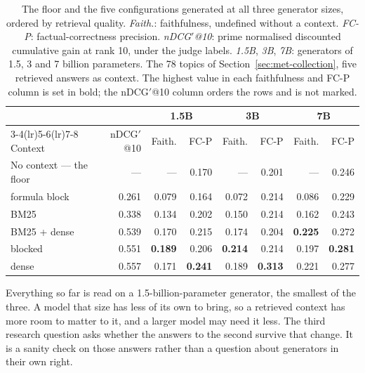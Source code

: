 \begin{table}[!t]
\centering
\small
\setlength{\tabcolsep}{4.5pt}
\renewcommand{\arraystretch}{1.15}
\begin{tabular}{lrrrrrrr}
\toprule
& & \multicolumn{2}{c}{1.5B} & \multicolumn{2}{c}{3B} & \multicolumn{2}{c}{7B} \\
\cmidrule(lr){3-4}\cmidrule(lr){5-6}\cmidrule(lr){7-8}
Context & nDCG$'$@10 & Faith. & FC-P & Faith. & FC-P & Faith. & FC-P \\
\midrule
No context --- the floor & ---   & ---   & 0.170 & ---   & 0.201 & ---   & 0.246 \\
\addlinespace
formula block            & 0.261 & 0.079 & 0.164 & 0.072 & 0.214 & 0.086 & 0.229 \\
BM25                     & 0.338 & 0.134 & 0.202 & 0.150 & 0.214 & 0.162 & 0.243 \\
BM25 + dense             & 0.539 & 0.170 & 0.215 & 0.174 & 0.204 & \textbf{0.225} & 0.272 \\
blocked                  & 0.551 & \textbf{0.189} & 0.206 & \textbf{0.214} & 0.214 & 0.197 & \textbf{0.281} \\
dense                    & 0.557 & 0.171 & \textbf{0.241} & 0.189 & \textbf{0.313} & 0.221 & 0.277 \\
\bottomrule
\end{tabular}
\caption[The three generator sizes]{The floor and the five configurations generated at all three generator sizes, ordered by
retrieval quality. \emph{Faith.}: faithfulness, undefined without a context. \emph{FC-P}:
factual-correctness precision. \emph{nDCG$'$@10}: prime normalised discounted cumulative gain at
rank 10, under the judge labels. \emph{1.5B}, \emph{3B}, \emph{7B}: generators of 1.5, 3 and 7
billion parameters. The 78 topics of Section~\ref{sec:met-collection}, five retrieved answers as
context. The highest value in each faithfulness and FC-P column is set in bold; the nDCG$'$@10
column orders the rows and is not marked.}
\label{tab:gen-res-sizes}
\end{table}

Everything so far is read on a 1.5-billion-parameter generator, the smallest of the three. A model
that size has less of its own to bring, so a retrieved context has more room to matter to it, and a
larger model may need it less. The third research question asks whether the answers to the second
survive that change. It is a sanity check on those answers rather than a question about generators
in their own right.

